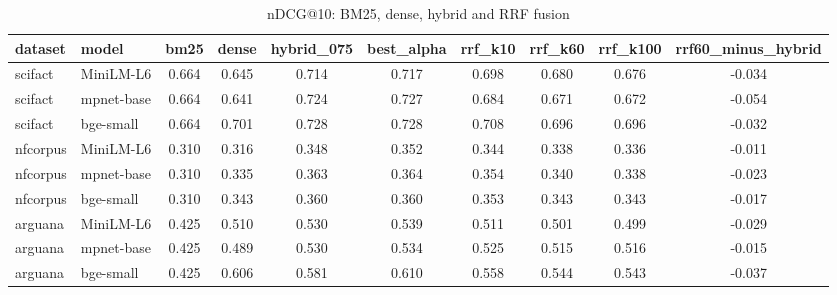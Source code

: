 \begin{table}[t]
\centering
\caption{nDCG@10: BM25, dense, hybrid and RRF fusion}
\label{tab:rrf}
\begin{tabular}{llcccccccc}
\toprule
dataset & model & bm25 & dense & hybrid\_075 & best\_alpha & rrf\_k10 & rrf\_k60 & rrf\_k100 & rrf60\_minus\_hybrid \\
\midrule
scifact & MiniLM-L6 & 0.664 & 0.645 & 0.714 & 0.717 & 0.698 & 0.680 & 0.676 & -0.034 \\
scifact & mpnet-base & 0.664 & 0.641 & 0.724 & 0.727 & 0.684 & 0.671 & 0.672 & -0.054 \\
scifact & bge-small & 0.664 & 0.701 & 0.728 & 0.728 & 0.708 & 0.696 & 0.696 & -0.032 \\
nfcorpus & MiniLM-L6 & 0.310 & 0.316 & 0.348 & 0.352 & 0.344 & 0.338 & 0.336 & -0.011 \\
nfcorpus & mpnet-base & 0.310 & 0.335 & 0.363 & 0.364 & 0.354 & 0.340 & 0.338 & -0.023 \\
nfcorpus & bge-small & 0.310 & 0.343 & 0.360 & 0.360 & 0.353 & 0.343 & 0.343 & -0.017 \\
arguana & MiniLM-L6 & 0.425 & 0.510 & 0.530 & 0.539 & 0.511 & 0.501 & 0.499 & -0.029 \\
arguana & mpnet-base & 0.425 & 0.489 & 0.530 & 0.534 & 0.525 & 0.515 & 0.516 & -0.015 \\
arguana & bge-small & 0.425 & 0.606 & 0.581 & 0.610 & 0.558 & 0.544 & 0.543 & -0.037 \\
\bottomrule
\end{tabular}
\end{table}